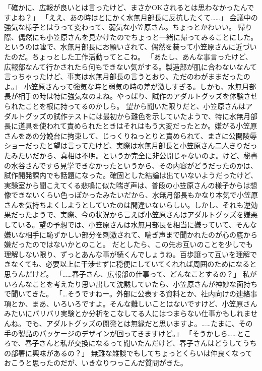 「確かに、広報が良いとは言ったけど、まさかOKされるとは思わなかったんですよね？」
「ええ、あの時はとにかく水無月部長に反抗したくて……」
会議中の強気な様子とはうって変わって、弱気な小笠原さん。ちょっとかわいい。
帰り際、偶然にも小笠原さんを見かけたのでちょっと一緒に帰ってみることにした。というのは嘘で、水無月部長にお願いされて、偶然を装って小笠原さんに近づいたのだ。ちょっとした工作活動ってとこね。
「あたし、あんな事言ったけど、広報部なんて行かされたら何もできない気がする。製造部が肌に合わないなんて言っちゃったけど、事実は水無月部長の言うとおり、ただのわがままだったのよ。」
小笠原さんって強気な時と弱気の時の差が激しすぎる。しかも、水無月部長が相手の時は特に強気なのよね。やっぱり、試作のアダルトグッズを体験させられたことを根に持ってるのかしら。
望から聞いた限りだと、小笠原さんはアダルトグッズの試作テストには最初から難色を示していたようで、特に水無月部長に道具を使われて責められたときはそれはもう大変だったとか。嫌がる小笠原さんをあの分娩台に拘束して、じっくりねっとりと責められて、まさに公開陵辱ショーだったと望は言ってたけど、実際は水無月部長と小笠原さん二人きりだったみたいだから、真相は不明。というか完全に非公開じゃないのよ。けど、秘書の水谷さんですら見学できなかったというから、その内容がどうだったのかは、試作開発課内でも話題になった。確固とした結論は出ていないようだったけど、実験室から聞こえてくる悲鳴に似た喘ぎ声は、普段の小笠原さんの様子からは想像できないくらい色っぽかったみたいだから、水無月部長もかなり本気で小笠原さんを気持ちよくしようとしていたのは間違いないらしい。しかし、それも逆効果だったようで、実際、今の状況から言えば小笠原さんはアダルトグッズを嫌悪している。望の予想では、小笠原さんは水無月部長を相当に嫌っていて、そんな嫌いな相手に恥ずかしい部分を刺激されて、喘ぎ声まで聞かれたのが心の底から嫌だったのではないかとのこと。
だとしたら、この先お互いのことを少しでも理解しない限り、ずっとあんな事が続くんでしょうね。百歩譲って互いを理解できなくても、必要以上に干渉せずに穏便にしていてくれれば周囲のためになると思うんだけど。
「……春子さん、広報部の仕事って、どんなことするの？」
私がいろんなことを考えたり思い出して沈黙していたら、小笠原さんが神妙な面持ちで聞いてきた。
「…そうですねー。外部に公表する資料とか、社内向けの連絡事項とか、まあ、いろいろですよ。そんな難しいことはないですけど、小笠原さんみたいにバリバリ実験とか分析をこなしてる人にはつまらない仕事かもしれませんね。でも、アダルトグッズの開発とは無縁だと思いますよ。……たまに、その手の製品のパッケージのデザインが回ってきますけど。」
「そうかしら……ところで、春子さんと私が交換になるって聞いたんだけど、春子さんはどうしてうちの部署に興味があるの？」
無難な雑談でもしてちょっとくらいは仲良くなっておこうと思ったのだが、いきなりつっこんだ質問がきた。
